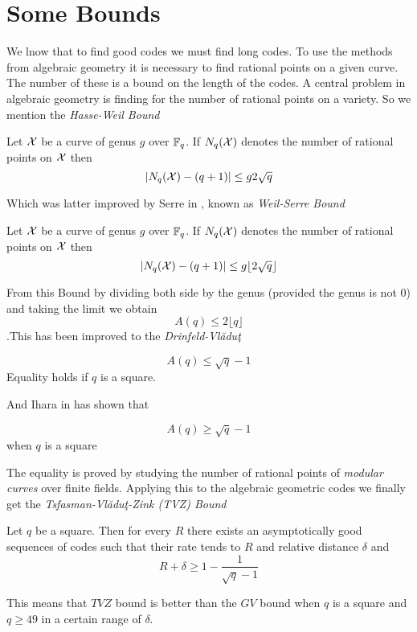 \section{Some Bounds}
We lnow that to find good codes we must find long codes. To use the methods from algebraic geometry it is necessary to find rational points on a given curve. The number of these is a bound on the length of the codes. A central problem in algebraic geometry is finding for the number of rational points on a variety. So we mention the \textit{Hasse-Weil Bound}
\begin{theorem}
	Let $\mathcal{X}$ be a curve of genus $g$ over $\mathbb{F}_q$. If $N_q(\mathcal{X})$ denotes the number of rational points on $\mathcal{X}$ then $$|N_q(\mathcal{X})-(q+1)|\leq g 2\sqrt{q}$$
\end{theorem}
Which was latter improved by Serre in \cite{weilserre}, known as \textit{Weil-Serre Bound}
\begin{theorem}
	Let $\mathcal{X}$ be a curve of genus $g$ over $\mathbb{F}_q$. If $N_q(\mathcal{X})$ denotes the number of rational points on $\mathcal{X}$ then $$|N_q(\mathcal{X})-(q+1)|\leq g\lfloor 2\sqrt{q}\rfloor$$
\end{theorem}
From this Bound by dividing both side by the genus (provided the genus is not 0) and taking the limit we obtain $$A(q)\leq 2\lfloor q\rfloor$$.This has been improved to the \textit{Drinfeld-Vl\u{a}du\c{t}}
\begin{theorem}
	$$A(q)\leq \sqrt{q}-1$$Equality holds if $q$ is a square.
\end{theorem}
And Ihara in \cite{Ihara} has shown that 
\begin{theorem}
	$$A(q)\geq \sqrt{q}-1$$ when $q$ is a square
\end{theorem}
The equality is proved by studying the number of rational points of \textit{modular curves} over finite fields. Applying this to the algebraic geometric codes we finally get the \textit{Tsfasman-Vl\u{a}du\c{t}-Zink (TVZ) Bound}
\begin{theorem}
	Let $q$ be a square. Then for every $R$ there exists an asymptotically good sequences of codes such that their rate tends to $R$ and relative distance $\delta$ and $$R+\delta\geq 1-\frac1{\sqrt{q}-1}$$
\end{theorem} 
This means that $TVZ$ bound is better than the $GV$ bound when $q$ is a square and $q\geq 49$ in a certain range of $\delta$.

